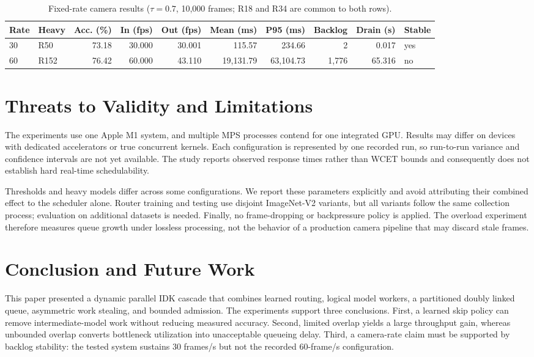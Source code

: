 \begin{table}[t]
\caption{Fixed-rate camera results ($\tau=0.7$, 10,000 frames; R18 and R34 are common to both rows).}
\label{tab:camera}
\centering
\small
\begin{tabular}{llrrrrrrrl}
\hline
Rate & Heavy & Acc. (\%) & In (fps) & Out (fps) & Mean (ms) & P95 (ms) & Backlog & Drain (s) & Stable \\
\hline
30 & R50 & 73.18 & 30.000 & 30.001 & 115.57 & 234.66 & 2 & 0.017 & yes \\
60 & R152 & 76.42 & 60.000 & 43.110 & 19,131.79 & 63,104.73 & 1,776 & 65.316 & no \\
\hline
\end{tabular}
\end{table}

\section{Threats to Validity and Limitations}
\label{sec:limitations}

The experiments use one Apple M1 system, and multiple MPS processes contend
for one integrated GPU.  Results may differ on devices with dedicated
accelerators or true concurrent kernels.  Each configuration is represented by
one recorded run, so run-to-run variance and confidence intervals are not yet
available.  The study reports observed response times rather than WCET bounds
and consequently does not establish hard real-time schedulability.

Thresholds and heavy models differ across some configurations.  We report
these parameters explicitly and avoid attributing their combined effect to the
scheduler alone.  Router training and testing use disjoint ImageNet-V2
variants, but all variants follow the same collection process; evaluation on
additional datasets is needed.  Finally, no frame-dropping or backpressure
policy is applied.  The overload experiment therefore measures queue growth
under lossless processing, not the behavior of a production camera pipeline
that may discard stale frames.

\section{Conclusion and Future Work}
\label{sec:conclusion}

This paper presented a dynamic parallel IDK cascade that combines learned
routing, logical model workers, a partitioned doubly linked queue, asymmetric
work stealing, and bounded admission.  The experiments support three
conclusions.  First, a learned skip policy can remove intermediate-model work
without reducing measured accuracy.  Second, limited overlap yields a large
throughput gain, whereas unbounded overlap converts bottleneck utilization into
unacceptable queueing delay.  Third, a camera-rate claim must be supported by
backlog stability: the tested system sustains 30 frames/s but not the recorded
60-frame/s configuration.

